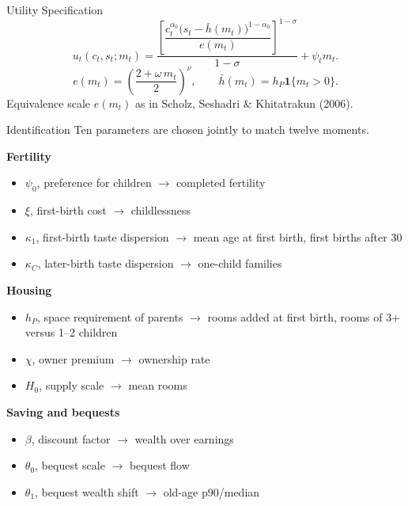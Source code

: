 \documentclass[11pt,aspectratio=169]{beamer}
\newcommand{\1}{\mathbf 1}
\begin{document}
\begin{frame}{Utility Specification}
\small
\[
u_t(c_t,s_t;m_t)=
\frac{\left[\dfrac{c_t^{\alpha_0}\bigl(s_t-\bar h(m_t)\bigr)^{1-\alpha_0}}{e(m_t)}\right]^{1-\sigma}}{1-\sigma}
+\psi_tm_t.
\]
\[
e(m_t)=\left(\frac{2+\omega\, m_t}{2}\right)^{\nu},\qquad
\bar h(m_t)=h_P\mathbf{1}\{m_t>0\}.
\]
\smallskip
Equivalence scale $e(m_t)$ as in Scholz, Seshadri \& Khitatrakun (2006).
\end{frame}


\begin{frame}{Identification}
\footnotesize
Ten parameters are chosen jointly to match twelve moments.

\medskip
\textbf{Fertility}
\vspace{-3pt}\begin{itemize}\setlength\itemsep{0pt}
  \item $\psi_0$, preference for children $\to$ completed fertility
  \item $\xi$, first-birth cost $\to$ childlessness
  \item $\kappa_1$, first-birth taste dispersion $\to$ mean age at first birth, first births after 30
  \item $\kappa_C$, later-birth taste dispersion $\to$ one-child families
\end{itemize}
\vspace{-2pt}
\textbf{Housing}
\vspace{-3pt}\begin{itemize}\setlength\itemsep{0pt}
  \item $h_P$, space requirement of parents $\to$ rooms added at first birth, rooms of 3+ versus 1--2 children
  \item $\chi$, owner premium $\to$ ownership rate
  \item $H_0$, supply scale $\to$ mean rooms
\end{itemize}
\vspace{-2pt}
\textbf{Saving and bequests}
\vspace{-3pt}\begin{itemize}\setlength\itemsep{0pt}
  \item $\beta$, discount factor $\to$ wealth over earnings
  \item $\theta_0$, bequest scale $\to$ bequest flow
  \item $\theta_1$, bequest wealth shift $\to$ old-age p90/median
\end{itemize}
\end{frame}
\end{document}
